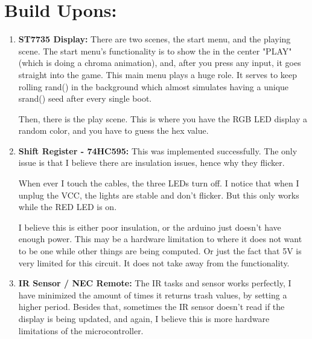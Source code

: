 \documentclass[12pt]{article}
\begin{document}
\section{Build Upons:}
\begin{enumerate}
  \item \textbf{ST7735 Display:}
    There are two scenes, the start menu, and the playing scene.
    The start menu's functionality is to show the in the center "PLAY"
    (which is doing a chroma animation),
    and, after you press any input, it goes straight into the game.
    This main menu plays a huge role. It serves to keep rolling rand()
    in the background which almost simulates having
    a unique srand() seed after every single boot.

    Then, there is the play scene. This is where you have the RGB LED
    display a random color, and you have to guess the hex value.
  \item \textbf{Shift Register - 74HC595:} This was implemented successfully.
    The only issue is that I believe there are insulation issues, hence why they flicker.

    When ever I touch the cables, the three LEDs turn off.
    I notice that when I unplug the VCC, the lights are stable and don't flicker.
    But this only works while the RED LED is on. 


    I believe this is either poor insulation, or the arduino
    just doesn't have enough power. 
    This may be a hardware limitation to where it does not want to be one while 
    other things are being computed. Or just the fact that 5V is very limited for this circuit.
    It does not take away from the functionality.
  \item \textbf{IR Sensor / NEC Remote:}
    The IR tasks and sensor works perfectly,
    I have minimized the amount of times it returns trash values, by setting a higher
    period. Besides that, sometimes the IR sensor doesn't read if the display is being updated,
    and again, I believe this is more hardware limitations of the microcontroller.
\end{enumerate}

\pagebreak
\end{document}
